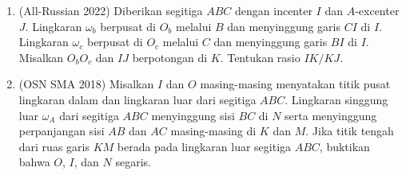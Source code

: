 \documentclass[12pt]{scrartcl}
\begin{document}
\begin{enumerate}[resume]
	\item (All-Russian 2022)
	Diberikan segitiga $ABC$ dengan incenter $I$ dan $A$-excenter $J$.
	Lingkaran $\omega_b$ berpusat di $O_b$ melalui $B$ dan menyinggung
	garis $CI$ di $I$.
	Lingkaran $\omega_c$ berpusat di $O_c$ melalui $C$ dan menyinggung
	garis $BI$ di $I$.
	Misalkan $O_bO_c$ dan $IJ$ berpotongan di $K$.
	Tentukan rasio $IK/KJ$.

	\item (OSN SMA 2018)
	Misalkan $I$ dan $O$ masing-masing menyatakan titik pusat lingkaran
	dalam dan lingkaran luar dari segitiga $ABC$.
	Lingkaran singgung luar $\omega_A$ dari segitiga $ABC$ menyinggung
	sisi $BC$ di $N$ serta menyinggung perpanjangan sisi $AB$ dan $AC$
	masing-masing di $K$ dan $M$.
	Jika titik tengah dari ruas garis $KM$ berada pada lingkaran luar
	segitiga $ABC$, buktikan bahwa $O$, $I$, dan $N$ segaris.

\end{enumerate}
\end{document}
